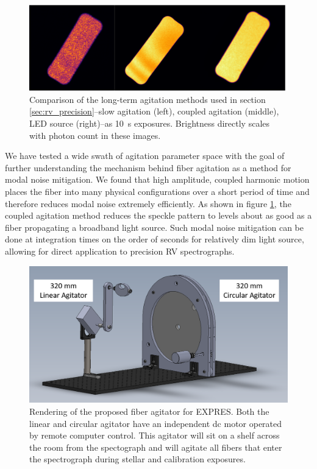 \documentclass[twocolumn]{emulateapj}
\begin{document}
\begin{figure}
\centering
	\includegraphics[width=\columnwidth]{images/fiber_rv_error.pdf}
	\caption{Comparison of the long-term agitation methods used in section \ref{sec:rv_precision}--slow agitation (left), coupled agitation (middle), LED source (right)--as \SI{10}{\second} exposures. Brightness directly scales with photon count in these images.}
\label{fig:fiber_rv_error}
\end{figure}

We have tested a wide swath of agitation parameter space with the goal of further understanding the mechanism behind fiber agitation as a method for modal noise mitigation. We found that high amplitude, coupled harmonic motion places the fiber into many physical configurations over a short period of time and therefore reduces modal noise extremely efficiently. As shown in figure \ref{fig:fiber_rv_error}, the coupled agitation method reduces the speckle pattern to levels about as good as a fiber propagating a broadband light source. Such modal noise mitigation can be done at integration times on the order of seconds for relatively dim light source, allowing for direct application to precision RV spectrographs.

\begin{figure}
\centering
	\includegraphics[width=\columnwidth]{images/agitator_model.png}
	\caption{Rendering of the proposed fiber agitator for EXPRES. Both the linear and circular agitator have an independent dc motor operated by remote computer control. This agitator will sit on a shelf across the room from the spectograph and will agitate all fibers that enter the spectrograph during stellar and calibration exposures.}
\label{fig:agitator_model}
\end{figure}
\end{document}
